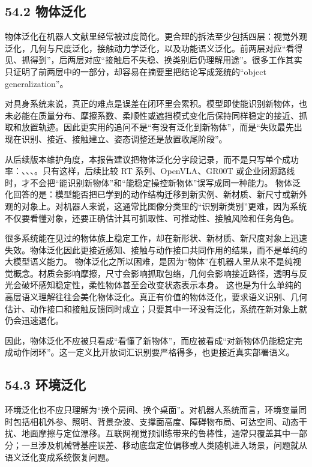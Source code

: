 \subsection*{54.2 物体泛化}


物体泛化在机器人文献里经常被过度简化。更合理的拆法至少包括四层：视觉外观泛化，几何与尺度泛化，接触动力学泛化，以及功能语义泛化。前两层对应“看得见、抓得到”，后两层对应“接触后不失稳、换类别后仍理解用途”。很多工作其实只证明了前两层中的一部分，却容易在摘要里把结论写成笼统的“object generalization”。

对具身系统来说，真正的难点是误差在闭环里会累积。模型即使能识别新物体，也未必能在质量分布、摩擦系数、柔顺性或遮挡模式变化后保持同样稳定的接近、抓取和放置轨迹。因此更实用的追问不是“有没有泛化到新物体”，而是“失败最先出现在识别、接近、接触建立、姿态调整还是放置收尾阶段”。

从后续版本维护角度，本报告建议把物体泛化分字段记录，而不是只写单个成功率：\texttt{}、\texttt{}、、\texttt{}。只有这样，后续比较 RT 系列、OpenVLA、GR00T 或企业闭源路线时，才不会把“能识别新物体”和“能稳定操控新物体”误写成同一种能力。 物体泛化回答的是：模型能否把已学到的动作结构迁移到新实例、新材质、新尺寸或新外观的对象上。对机器人来说，这通常比图像分类里的“识别新类别”更难，因为系统不仅要看懂对象，还要正确估计其可抓取性、可推动性、接触风险和任务角色。

很多系统能在见过的物体族上稳定工作，却在新形状、新材质、新尺度对象上迅速失效。物体泛化因此更接近感知、接触与动作接口共同作用的结果，而不是单纯的大模型语义能力。 物体泛化之所以困难，是因为“物体”在机器人里从来不是纯视觉概念。材质会影响摩擦，尺寸会影响抓取包络，几何会影响接近路径，透明与反光会破坏感知稳定性，柔性物体甚至会改变状态表示本身。 这也是为什么单纯的高层语义理解往往会美化物体泛化。真正有价值的物体泛化，要求语义识别、几何估计、动作接口和接触反馈同时成立；只要其中一环没有泛化，系统在新对象上就仍会迅速退化。

因此，物体泛化不应被只看成“看懂了新物体”，而应被看成“对新物体仍能稳定完成动作闭环”。这一定义比开放词汇识别要严格得多，也更接近真实部署语义。

\subsection*{54.3 环境泛化}


环境泛化也不应只理解为“换个房间、换个桌面”。对机器人系统而言，环境变量同时包括相机外参、照明、背景杂波、支撑面高度、障碍物布局、可达空间、动态干扰、地面摩擦与定位漂移。互联网视觉预训练带来的鲁棒性，通常只覆盖其中一部分；一旦涉及机械臂基座误差、移动底盘定位偏移或人类随机进入场景，问题就从语义泛化变成系统恢复问题。

